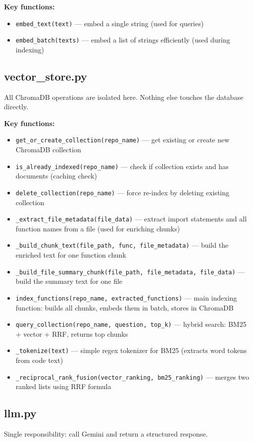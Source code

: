 \documentclass[a4paper,11pt]{article}
\begin{document}
\textbf{Key functions:}
\begin{itemize}
    \item \texttt{embed\_text(text)} --- embed a single string (used for queries)
    \item \texttt{embed\_batch(texts)} --- embed a list of strings efficiently (used during indexing)
\end{itemize}

\subsection{vector\_store.py}
All ChromaDB operations are isolated here. Nothing else touches the database directly.

\textbf{Key functions:}
\begin{itemize}
    \item \texttt{get\_or\_create\_collection(repo\_name)} --- get existing or create new ChromaDB collection
    \item \texttt{is\_already\_indexed(repo\_name)} --- check if collection exists and has documents (caching check)
    \item \texttt{delete\_collection(repo\_name)} --- force re-index by deleting existing collection
    \item \texttt{\_extract\_file\_metadata(file\_data)} --- extract import statements and all function names from a file (used for enriching chunks)
    \item \texttt{\_build\_chunk\_text(file\_path, func, file\_metadata)} --- build the enriched text for one function chunk
    \item \texttt{\_build\_file\_summary\_chunk(file\_path, file\_metadata, file\_data)} --- build the summary text for one file
    \item \texttt{index\_functions(repo\_name, extracted\_functions)} --- main indexing function: builds all chunks, embeds them in batch, stores in ChromaDB
    \item \texttt{query\_collection(repo\_name, question, top\_k)} --- hybrid search: BM25 + vector + RRF, returns top chunks
    \item \texttt{\_tokenize(text)} --- simple regex tokenizer for BM25 (extracts word tokens from code text)
    \item \texttt{\_reciprocal\_rank\_fusion(vector\_ranking, bm25\_ranking)} --- merges two ranked lists using RRF formula
\end{itemize}

\subsection{llm.py}
Single responsibility: call Gemini and return a structured response.
\end{document}
